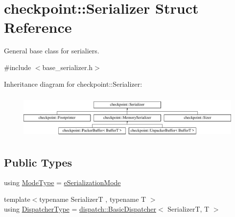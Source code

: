 \hypertarget{structcheckpoint_1_1_serializer}{}\section{checkpoint\+:\+:Serializer Struct Reference}
\label{structcheckpoint_1_1_serializer}


General base class for serialiers.  




{\ttfamily \#include $<$base\+\_\+serializer.\+h$>$}

Inheritance diagram for checkpoint\+:\+:Serializer\+:\begin{figure}[H]
\begin{center}
\leavevmode
\includegraphics[height=2.314050cm]{structcheckpoint_1_1_serializer}
\end{center}
\end{figure}
\subsection*{Public Types}
\begin{DoxyCompactItemize}
\item 
using \hyperlink{structcheckpoint_1_1_serializer_a4c307e2592dc4224d8a13148109c5764}{Mode\+Type} = \hyperlink{namespacecheckpoint_ae2509499ccd8b1dc48fb535bf8aa3059}{e\+Serialization\+Mode}
\item 
{\footnotesize template$<$typename SerializerT , typename T $>$ }\\using \hyperlink{structcheckpoint_1_1_serializer_ad8effc5884f1ed37b6b4507422f6d72c}{Dispatcher\+Type} = \hyperlink{structcheckpoint_1_1dispatch_1_1_basic_dispatcher}{dispatch\+::\+Basic\+Dispatcher}$<$ SerializerT, T $>$
\end{DoxyCompactItemize}
